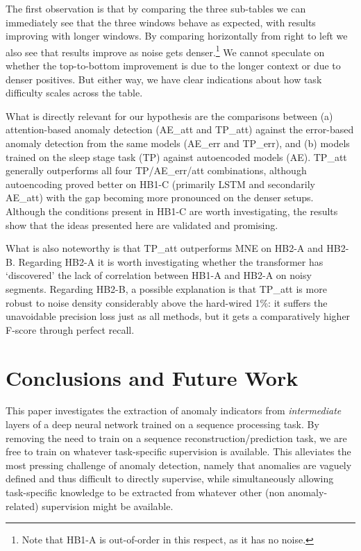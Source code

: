 \documentclass[runningheads]{llncs}
\begin{document}
The first observation is that by comparing the three sub-tables we can
immediately see that the three windows behave as expected, with
results improving with longer windows. By comparing horizontally from
right to left we also see that results improve as noise gets
denser.\footnote{Note that HB1-A is out-of-order in this respect, as
  it has no noise.}
We cannot speculate on whether the top-to-bottom improvement
is due to the longer context or due to denser positives. But either
way, we have clear indications about how task difficulty scales across
the table.

What is directly relevant for our hypothesis are the comparisons
between
(a) attention-based anomaly detection (AE\_att and TP\_att) against
the error-based anomaly detection from the same models (AE\_err and
TP\_err), and (b) models trained on the sleep stage task (TP) against
autoencoded models (AE).
TP\_att generally outperforms all four TP/AE\_err/att combinations,
although autoencoding proved better on HB1-C (primarily LSTM and
secondarily AE\_att) with the gap becoming more pronounced on the
denser setups. 
Although the conditions present in HB1-C are worth investigating,
the results show that the ideas presented here are validated and
promising.

What is also noteworthy is that TP\_att outperforms MNE on HB2-A and HB2-B.
Regarding HB2-A it is worth investigating whether the transformer has
`discovered' the lack of correlation between HB1-A and HB2-A on noisy
segments. Regarding HB2-B, a possible explanation is that TP\_att is
more robust to noise density considerably above the hard-wired 1\%: it
suffers the unavoidable precision loss just as all methods, but it
gets a comparatively higher F-score through perfect recall.



\section{Conclusions and Future Work}
\label{sec:conc}

This paper investigates the extraction of anomaly indicators from
\emph{intermediate} layers of a deep neural network trained on a
sequence processing task. By removing the need to train on a sequence
reconstruction/prediction task, we are free to train on whatever
task-specific supervision is available. This alleviates the most
pressing challenge of anomaly detection, namely that anomalies are
vaguely defined and thus difficult to directly supervise, while
simultaneously allowing task-specific knowledge to be extracted from
whatever other (non anomaly-related) supervision might be available.
\end{document}
